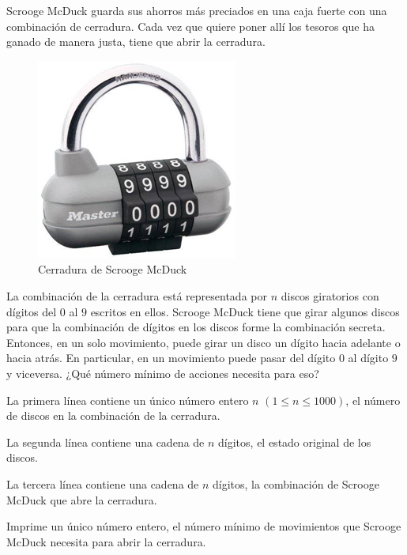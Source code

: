 
Scrooge McDuck guarda sus ahorros más preciados en una caja fuerte con una combinación de cerradura. Cada vez que quiere poner allí los tesoros que ha ganado de manera justa, tiene que abrir la cerradura.

\begin{figure}[h]
    \centering
    \caption{Cerradura de Scrooge McDuck}
    \includegraphics[scale=.5]{template/CombinacionDeLaCerradura/images/cerradura.png}
\end{figure}

La combinación de la cerradura está representada por $n$ discos giratorios con dígitos del $0$ al $9$ escritos en ellos. Scrooge McDuck tiene que girar algunos discos para que la combinación de dígitos en los discos forme la combinación secreta. Entonces, en un solo movimiento, puede girar un disco un dígito hacia adelante o hacia atrás. En particular, en un movimiento puede pasar del dígito $0$ al dígito $9$ y viceversa. ¿Qué número mínimo de acciones necesita para eso?


La primera línea contiene un único número entero $n$ $(1 \le n \le 1000)$, el número de discos en la combinación de la cerradura.

La segunda línea contiene una cadena de $n$ dígitos, el estado original de los discos.

La tercera línea contiene una cadena de $n$ dígitos, la combinación de Scrooge McDuck que abre la cerradura.

\outputText

Imprime un único número entero, el número mínimo de movimientos que Scrooge McDuck necesita para abrir la cerradura.

\exampleCases

